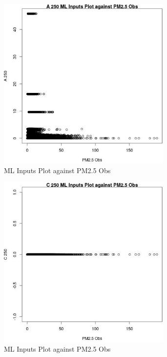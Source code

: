\begin{figure} 
\centering  
\includegraphics[width=0.77\textwidth]{Code_Outputs/Report_ML_input_PM25_Step4_part_e_de_duplicated_aves_A_250vPM25_Obs.jpg} 
\caption{\label{fig:Report_ML_input_PM25_Step4_part_e_de_duplicated_avesA_250vPM25_Obs}ML Inputs Plot against PM2.5 Obs} 
\end{figure} 
 

\begin{figure} 
\centering  
\includegraphics[width=0.77\textwidth]{Code_Outputs/Report_ML_input_PM25_Step4_part_e_de_duplicated_aves_C_250vPM25_Obs.jpg} 
\caption{\label{fig:Report_ML_input_PM25_Step4_part_e_de_duplicated_avesC_250vPM25_Obs}ML Inputs Plot against PM2.5 Obs} 
\end{figure} 
 

